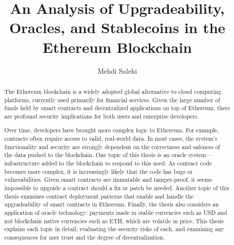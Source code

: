 \documentclass[letterpaper,12pt,onecolumn,final]{report}
\author{Mehdi Salehi}
\title{An Analysis of Upgradeability, Oracles, and Stablecoins in the Ethereum Blockchain}
\begin{document}
\begin{abstract}
{%

The Ethereum blockchain is a widely adopted global alternative to cloud computing platforms, currently used primarily for financial services. Given the large number of funds held by smart contracts and decentralized applications on top of Ethereum, there are profound security implications for both users and enterprise developers.

Over time, developers have brought more complex logic to Ethereum. For example, contracts often require access to valid, real-world data. In most cases, the system's functionality and security are strongly dependent on the correctness and safeness of the data pushed to the blockchain. One topic of this thesis is an oracle system---infrastructure added to the blockchain to respond to this need.
As contract code becomes more complex, it is increasingly likely that the code has bugs or vulnerabilities. Given smart contracts are immutable and tamper-proof, it seems impossible to upgrade a contract should a fix or patch be needed. Another topic of this thesis examines contract deployment patterns that enable and handle the upgradeability of smart contracts in Ethereum. Finally, the thesis also considers an application of oracle technology: payments made in stable currencies such as USD and not blockchain native currencies such as ETH, which are volatile in price. This thesis explains each topic in detail, evaluating the security risks of each, and examining any consequences for user trust and the degree of decentralization. 




}
\end{abstract}
\end{document}
